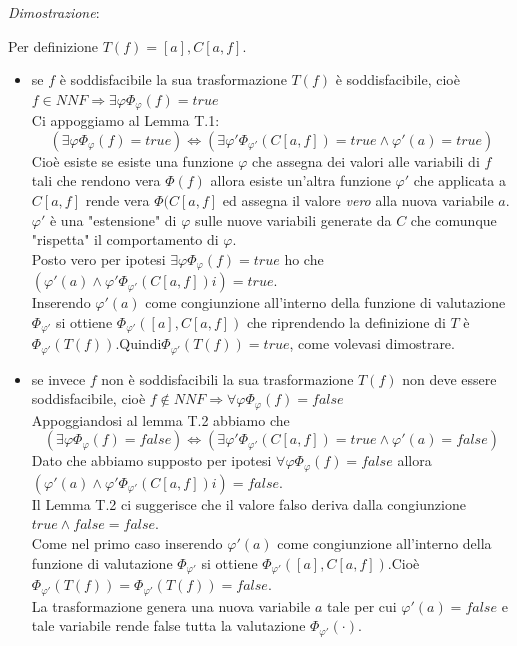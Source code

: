 \documentclass[a4paper]{article}
\newenvironment{dimostrazione}{\textit{Dimostrazione}:\begin{adjustwidth}{1cm}{}}{\end{adjustwidth}}
\begin{document}
\begin{dimostrazione}
	Per definizione $T(f) = [a],C[a,f]$.
	\begin{itemize}
		\item se $f$ è soddisfacibile la sua trasformazione $T(f)$ è soddisfacibile, cioè $f \in NNF \Rightarrow \exists \varphi \Phi_\varphi(f) = true$\\
			Ci appoggiamo al Lemma T.1: 
			$$(\exists \varphi \Phi_\varphi(f) = true) \Leftrightarrow (\exists \varphi' \Phi_{\varphi'}(C[a,f]) = true \land \varphi'(a) = true)$$
			Cioè esiste se esiste una funzione $\varphi$ che assegna dei valori alle variabili di $f$ tali che rendono vera $\Phi(f)$ allora esiste un'altra funzione $\varphi'$ che applicata a $C[a,f]$ rende vera $\Phi(C[a,f]$ ed assegna il valore \textit{vero} alla nuova variabile $a$.$\varphi'$ è una "estensione" di $\varphi$ sulle nuove variabili generate da $C$ che comunque "rispetta" il comportamento di $\varphi$.\\
			Posto vero per ipotesi $\exists \varphi \Phi_\varphi(f)= true$ ho che $(\varphi'(a) \land \varphi' \Phi_{\varphi'}(C[a,f])i)=true$.\\
			Inserendo $\varphi'(a)$ come congiunzione all'interno della funzione di valutazione $\Phi_{\varphi'}$ si ottiene $\Phi_{\varphi'}([a],C[a,f])$ che riprendendo la definizione di $T$ è $\Phi_{\varphi'}(T(f))$.Quindi$\Phi_{\varphi'}(T(f))=true$, come volevasi dimostrare.
		\item se invece $f$ non è soddisfacibili la sua trasformazione $T(f)$ non deve essere soddisfacibile, cioè $f \notin NNF \Rightarrow \forall \varphi \Phi_\varphi(f) = false$\\
			Appoggiandosi al lemma T.2 abbiamo che
			$$(\exists \varphi \Phi_\varphi(f) = false) \Leftrightarrow (\exists \varphi' \Phi_{\varphi'}(C[a,f]) = true \land \varphi'(a) = false)$$
			Dato che abbiamo supposto per ipotesi $\forall \varphi \Phi_\varphi(f) = false$ allora $(\varphi'(a) \land \varphi' \Phi_{\varphi'}(C[a,f])i)=false$.\\
			Il Lemma T.2 ci suggerisce che il valore falso deriva dalla congiunzione $true \land false = false$.\\
			Come nel primo caso inserendo $\varphi'(a)$ come congiunzione all'interno della funzione di valutazione $\Phi_{\varphi'}$ si ottiene $\Phi_{\varphi'}([a],C[a,f])$.Cioè $\Phi_{\varphi'}(T(f)) = \Phi_{\varphi'}(T(f))=false$.\\
			La trasformazione genera una nuova variabile $a$ tale per cui $\varphi'(a) = false$ e tale variabile rende false tutta la valutazione $\Phi_{\varphi'}(\cdot)$.
	\end{itemize}
\end{dimostrazione}
\end{document}

